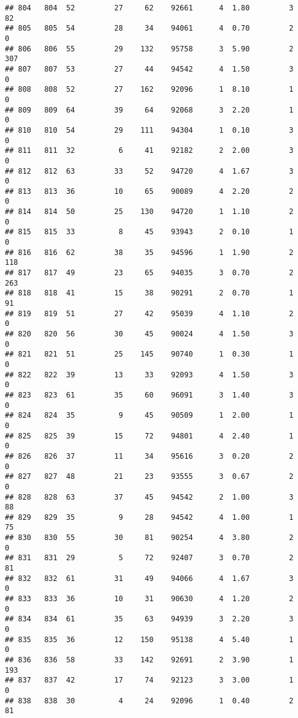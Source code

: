 \documentclass[
]{article}
\begin{document}
\begin{verbatim}
## 804   804  52         27     62    92661      4  1.80         3       82
## 805   805  54         28     34    94061      4  0.70         2        0
## 806   806  55         29    132    95758      3  5.90         2      307
## 807   807  53         27     44    94542      4  1.50         3        0
## 808   808  52         27    162    92096      1  8.10         1        0
## 809   809  64         39     64    92068      3  2.20         1        0
## 810   810  54         29    111    94304      1  0.10         3        0
## 811   811  32          6     41    92182      2  2.00         3        0
## 812   812  63         33     52    94720      4  1.67         3        0
## 813   813  36         10     65    90089      4  2.20         2        0
## 814   814  50         25    130    94720      1  1.10         2        0
## 815   815  33          8     45    93943      2  0.10         1        0
## 816   816  62         38     35    94596      1  1.90         2      118
## 817   817  49         23     65    94035      3  0.70         2      263
## 818   818  41         15     38    90291      2  0.70         1       91
## 819   819  51         27     42    95039      4  1.10         2        0
## 820   820  56         30     45    90024      4  1.50         3        0
## 821   821  51         25    145    90740      1  0.30         1        0
## 822   822  39         13     33    92093      4  1.50         3        0
## 823   823  61         35     60    96091      3  1.40         3        0
## 824   824  35          9     45    90509      1  2.00         1        0
## 825   825  39         15     72    94801      4  2.40         1        0
## 826   826  37         11     34    95616      3  0.20         2        0
## 827   827  48         21     23    93555      3  0.67         2        0
## 828   828  63         37     45    94542      2  1.00         3       88
## 829   829  35          9     28    94542      4  1.00         1       75
## 830   830  55         30     81    90254      4  3.80         2        0
## 831   831  29          5     72    92407      3  0.70         2       81
## 832   832  61         31     49    94066      4  1.67         3        0
## 833   833  36         10     31    90630      4  1.20         2        0
## 834   834  61         35     63    94939      3  2.20         3        0
## 835   835  36         12    150    95138      4  5.40         1        0
## 836   836  58         33    142    92691      2  3.90         1      193
## 837   837  42         17     74    92123      3  3.00         1        0
## 838   838  30          4     24    92096      1  0.40         2       81

\end{verbatim}
\end{document}
